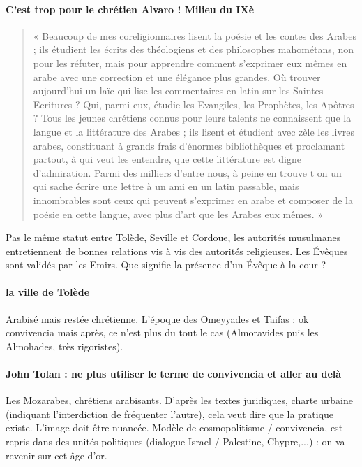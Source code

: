 \paragraph{C'est trop pour le chrétien Alvaro ! Milieu du IXè}
\begin{quote}
    «
Beaucoup de mes coreligionnaires lisent la poésie et les contes des Arabes ; ils
étudient les écrits des théologiens et des philosophes mahométans, non pour les
réfuter, mais pour apprendre comment s’exprimer eux mêmes en arabe avec une
correction et une élégance plus grandes. Où trouver aujourd’hui un laïc qui lise les
commentaires en latin sur les Saintes Ecritures ? Qui, parmi eux, étudie les Evangiles,
les Prophètes, les Apôtres ? Tous les jeunes chrétiens connus pour leurs talents ne
connaissent que la langue et la littérature des Arabes ; ils lisent et étudient avec zèle
les livres arabes, constituant à grands frais d’énormes bibliothèques et proclamant
partout, à qui veut les entendre, que cette littérature est digne d’admiration. Parmi des
milliers d’entre nous, à peine en trouve t on un qui sache écrire une lettre à un ami en
un latin passable, mais innombrables sont ceux qui peuvent s’exprimer en arabe et
composer de la poésie en cette langue, avec plus d’art que les Arabes eux mêmes. » 
\end{quote}

Pas le même statut entre Tolède, Seville et Cordoue, les autorités musulmanes entretiennent de bonnes relations vis à vis des autorités religieuses. Les Évêques sont validés par les Emirs. Que signifie la présence d'un Évêque à la cour ? 

\paragraph{la ville de Tolède} Arabisé mais restée chrétienne.  L'époque des Omeyyades et Taifas : ok convivencia mais après, ce n'est plus du tout le cas (Almoravides puis les Almohades, très rigoristes).

\paragraph{John Tolan : ne plus utiliser le terme de convivencia et aller au delà} Les Mozarabes, chrétiens arabisants. D'après les textes juridiques, charte urbaine (indiquant l'interdiction de fréquenter l'autre), cela veut dire que la pratique existe. L'image doit être nuancée. Modèle de cosmopolitisme / convivencia, est repris dans des unités politiques (dialogue Israel / Palestine, Chypre,...) : on va revenir sur cet âge d'or. 


